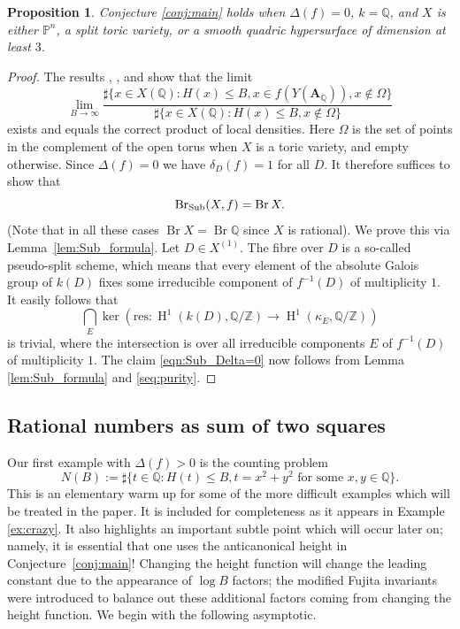 \documentclass[a4paper,12pt,reqno]{amsart}
\numberwithin{equation}{section} \numberwithin{figure}{section}
\DeclareMathOperator{\Br}{Br} \DeclareMathOperator{\Brnr}{Br_{nr}}
\DeclareMathOperator{\HH}{H}
\renewcommand\P{\mathbb{P}}
\newcommand\Z{\mathbb{Z}}
\newcommand\Q{\mathbb{Q}}
\newcommand{\Adele}{\mathbf{A}}
\renewcommand{\leq}{\leqslant}
\renewcommand{\#}{\sharp}
\newtheorem{proposition}[lemma]{Proposition}
\theoremstyle{definition}
\numberwithin{lemma}{section}
\begin{document}
\begin{proposition}
	Conjecture \ref{conj:main} holds when $\Delta(f) = 0$, $k= \Q$, and
	$X$ is either $\P^n$, a split toric variety, 	or a smooth quadric hypersurface of dimension
	at least $3$.
\end{proposition}
\begin{proof}
	The results \cite[Thm.~1.3]{LS16}, \cite[Thm.~1.5]{Hua21}, and \cite[Cor.~1.6]{BHB21}
	show that the limit
	$$\lim_{B \to \infty}  \frac{\#\{ x \in X(\Q) : H(x) \leq B, x \in f(Y(\Adele_\Q)), x \notin \Omega\}}
	{\#\{x \in X(\Q) : H(x) \leq B, x \notin \Omega\}}$$
	exists and equals the correct product of local densities.
	Here $\Omega$ is the set of points in the complement of the open torus 
	when $X$ is a toric variety, and empty otherwise. Since $\Delta(f) = 0$
	we have $\delta_D(f) = 1$ for all $D$. It therefore suffices to show that 
	\begin{equation} \label{eqn:Sub_Delta=0}
		\Sub(X,f) = \Br X.
	\end{equation}
	(Note that in all these cases $\Br X = \Br \Q$ since $X$ is rational).
	We prove this via Lemma~\ref{lem:Sub_formula}.
	Let $D \in X^{(1)}$. The fibre over $D$ is a so-called pseudo-split scheme,
	which means that every element of the absolute Galois group of $k(D)$
	fixes some irreducible component of $f^{-1}(D)$ of multiplicity $1$.
	It easily follows that
	$$\bigcap_E \ker \left(\mathrm{res} : \HH^1(k(D),\Q/\Z) \to \HH^1(\kappa_E,\Q/\Z)\right)$$
	is trivial, where the intersection is over all irreducible components
	$E$ of $f^{-1}(D)$ of multiplicity $1$. The claim \eqref{eqn:Sub_Delta=0}
	now follows from Lemma \ref{lem:Sub_formula} and \eqref{seq:purity}.
 \end{proof}



\subsection{Rational numbers as sum of two squares} \label{sec:elementary}
Our first example with $\Delta(f) > 0$ is the counting problem
\[N(B):=\#\{t\in \Q:H(t) \leq B, t=x^2+y^2  \textrm{ for some } x,y\in \Q \} .\]
This is an elementary warm up  for some of the more difficult examples which will be treated in the paper. It is included for completeness as it appears in Example \ref{ex:crazy}. It also highlights an important subtle point which will occur later on; namely, it is essential that one uses the anticanonical height in Conjecture~\ref{conj:main}! Changing the height function will change the leading constant due to the appearance of $\log B$ factors; the modified Fujita invariants were introduced to balance out these additional factors coming from changing the height function. We begin with the following asymptotic.
\end{document}
